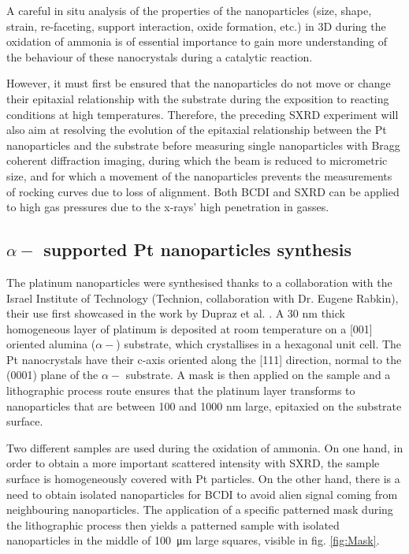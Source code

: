 A careful in situ analysis of the properties of the nanoparticles (size, shape, strain, re-faceting, support interaction, oxide formation, etc.) in 3D during the oxidation of ammonia is of essential importance to gain more understanding of the behaviour of these nanocrystals during a catalytic reaction.

However, it must first be ensured that the nanoparticles do not move or change their epitaxial relationship with the substrate during the exposition to reacting conditions at high temperatures.
Therefore, the preceding SXRD experiment will also aim at resolving the evolution of the epitaxial relationship between the Pt nanoparticles and the  substrate before measuring single nanoparticles with Bragg coherent diffraction imaging, during which the beam is reduced to micrometric size, and for which a movement of the nanoparticles prevents the measurements of rocking curves due to loss of alignment.
Both BCDI and SXRD can be applied to high gas pressures due to the x-rays’ high penetration in gasses.

\subsection{$\alpha-$ supported Pt nanoparticles synthesis}\label{sec:PtParticles}

The platinum nanoparticles were synthesised thanks to a collaboration with the Israel Institute of Technology (Technion, collaboration with Dr. Eugene Rabkin), their use first showcased in the work by Dupraz et al. \parencite*{Dupraz2017}.
A 30 nm thick homogeneous layer of platinum is deposited at room temperature on a [001] oriented alumina ($\alpha-$) substrate, which crystallises in a hexagonal unit cell.
The Pt nanocrystals have their c-axis oriented along the [111] direction, normal to the (0001) plane of the $\alpha-$ substrate.
A mask is then applied on the sample and a lithographic process route ensures that the platinum layer transforms to nanoparticles that are between 100 and 1000 nm large, epitaxied on the substrate surface.

Two different samples are used during the oxidation of ammonia.
On one hand, in order to obtain a more important scattered intensity with SXRD, the sample surface is homogeneously covered with Pt particles.
On the other hand, there is a need to obtain isolated nanoparticles for BCDI to avoid alien signal coming from neighbouring nanoparticles.
The application of a specific patterned mask during the lithographic process then yields a patterned sample with isolated nanoparticles in the middle of \qty{100}{\um} large squares, visible in fig. \ref{fig:Mask}.

